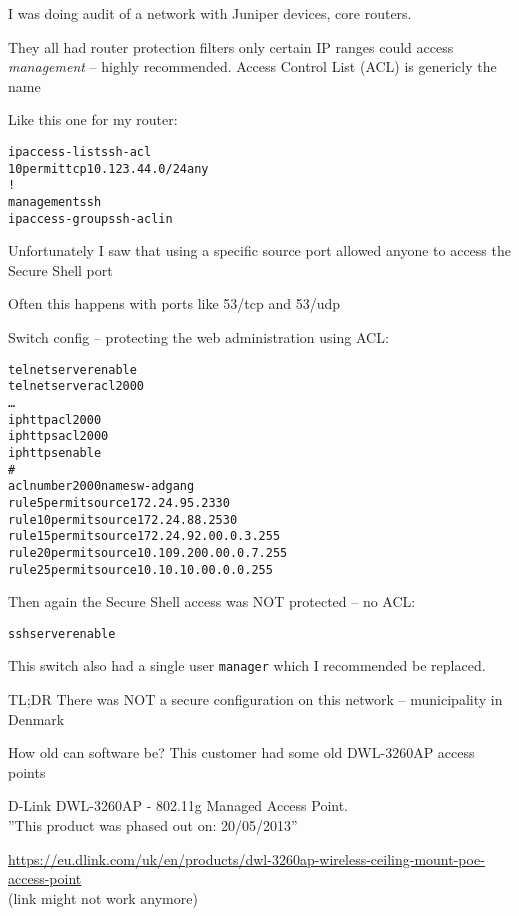 \documentclass[Screen16to9,17pt]{foils}
\begin{document}
I was doing audit of a network with Juniper devices, core routers.

They all had router protection filters only certain IP ranges could access \emph{management} -- highly recommended. Access Control List (ACL) is genericly the name

Like this one for my router:
\begin{alltt}
ip access-list ssh-acl
   10 permit tcp 10.123.44.0/24 any
!
management ssh
   ip access-group ssh-acl in
\end{alltt}

Unfortunately I saw that using a specific source port allowed anyone to access the Secure Shell port
\begin{list2}
\item Often this happens with ports like 53/tcp and 53/udp
\end{list2}



Switch config -- protecting the web administration using ACL:
\begin{alltt}\scriptsize
telnet server enable
telnet server acl 2000
…
ip http acl 2000
ip https acl 2000
ip https enable
#
acl number 2000 name sw-adgang
rule 5 permit source 172.24.95.233 0
rule 10 permit source 172.24.88.253 0
rule 15 permit source 172.24.92.0 0.0.3.255
rule 20 permit source 10.109.200.0 0.0.7.255
rule 25 permit source 10.10.10.0 0.0.0.255
\end{alltt}

Then again the Secure Shell access was NOT protected -- no ACL:
\begin{alltt}\scriptsize
ssh server enable
\end{alltt}

This switch also had a single user \verb+manager+ which I recommended be replaced.

TL;DR There was NOT a secure configuration on this network -- municipality in Denmark



How old can software be? This customer had some old DWL-3260AP access points

D-Link DWL-3260AP - 802.11g Managed Access Point.\\
”This product was phased out on: 20/05/2013”

\url{https://eu.dlink.com/uk/en/products/dwl-3260ap-wireless-ceiling-mount-poe-access-point}\\
 (link might not work anymore)
\end{document}
